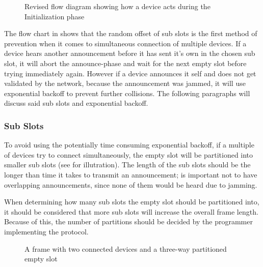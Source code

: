 \begin{figure}[p]
    \centering \footnotesize
    
    \caption{Revised flow diagram showing how a device acts during the Initialization phase}
    \label{fig:pseudo_flowMultiConnect}
\end{figure}

The flow chart in  shows that the random offset of sub slots is the first method of prevention when it comes to simultaneous connection of multiple devices.
If a device hears another announcement before it has sent it's own in the chosen sub slot, it will abort the announce-phase and wait for the next empty slot before trying immediately again.
However if a device announces it self and does not get validated by the network, because the announcement was jammed, it will use exponential backoff to prevent further collisions.
The following paragraphs will discuss said sub slots and exponential backoff.

\subsubsection{Sub Slots} %
\label{ssub:sub_slots}
To avoid using the potentially time consuming exponential backoff, if a multiple of devices try to connect simultaneously, the empty slot will be partitioned into smaller sub slots (see  for illutration). 
The length of the sub slots should be the longer than time it takes to transmit an announcement; is important not to have overlapping announcements, since none of them would be heard due to jamming.

When determining how many sub slots the empty slot should be partitioned into, it should be considered that more sub slots will increase the overall frame length.
Because of this, the number of partitions should be decided by the programmer implementing the protocol.

\begin{figure}[h]
    \centering \footnotesize
    
    \caption{A frame with two connected devices and a three-way partitioned empty slot}
    \label{fig:frame_wsubslots}
\end{figure}


